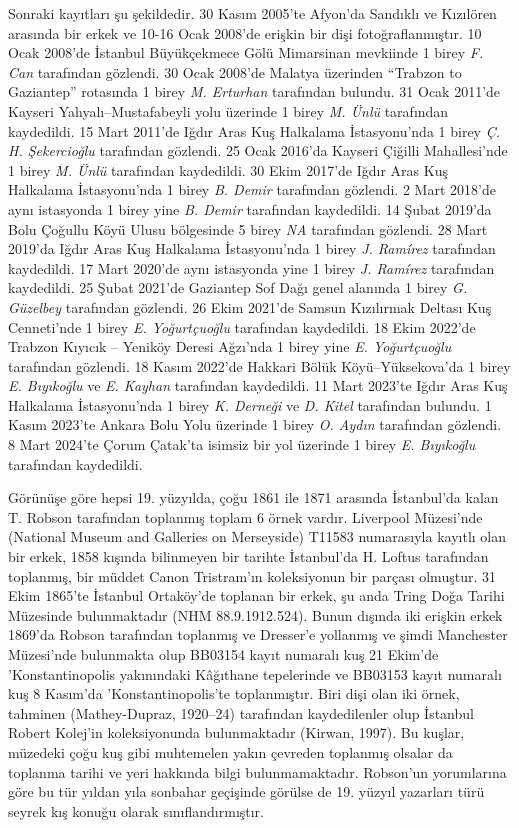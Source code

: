 \documentclass[
  10.5pt,
  a4paper,
  DIV=11,
  numbers=noendperiod,
  twocolumn]{scrreprt}
\begin{document}
Sonraki kayıtları şu şekildedir. 30 Kasım 2005'te Afyon'da Sandıklı ve
Kızılören arasında bir erkek ve 10-16 Ocak 2008'de erişkin bir dişi
fotoğraflanmıştır. 10 Ocak 2008'de İstanbul Büyükçekmece Gölü Mimarsinan
mevkiinde 1 birey \emph{F. Can} tarafından gözlendi. 30 Ocak 2008'de
Malatya üzerinden ``Trabzon to Gaziantep'' rotasında 1 birey \emph{M.
Erturhan} tarafından bulundu. 31 Ocak 2011'de Kayseri
Yahyalı--Mustafabeyli yolu üzerinde 1 birey \emph{M. Ünlü} tarafından
kaydedildi. 15 Mart 2011'de Iğdır Aras Kuş Halkalama İstasyonu'nda 1
birey \emph{Ç. H. Şekercioğlu} tarafından gözlendi. 25 Ocak 2016'da
Kayseri Çiğilli Mahallesi'nde 1 birey \emph{M. Ünlü} tarafından
kaydedildi. 30 Ekim 2017'de Iğdır Aras Kuş Halkalama İstasyonu'nda 1
birey \emph{B. Demir} tarafından gözlendi. 2 Mart 2018'de aynı
istasyonda 1 birey yine \emph{B. Demir} tarafından kaydedildi. 14 Şubat
2019'da Bolu Çoğullu Köyü Ulusu bölgesinde 5 birey \emph{NA} tarafından
gözlendi. 28 Mart 2019'da Iğdır Aras Kuş Halkalama İstasyonu'nda 1 birey
\emph{J. Ramírez} tarafından kaydedildi. 17 Mart 2020'de aynı istasyonda
yine 1 birey \emph{J. Ramírez} tarafından kaydedildi. 25 Şubat 2021'de
Gaziantep Sof Dağı genel alanında 1 birey \emph{G. Güzelbey} tarafından
gözlendi. 26 Ekim 2021'de Samsun Kızılırmak Deltası Kuş Cenneti'nde 1
birey \emph{E. Yoğurtçuoğlu} tarafından kaydedildi. 18 Ekim 2022'de
Trabzon Kıyıcık -- Yeniköy Deresi Ağzı'nda 1 birey yine \emph{E.
Yoğurtçuoğlu} tarafından gözlendi. 18 Kasım 2022'de Hakkari Bölük
Köyü--Yüksekova'da 1 birey \emph{E. Bıyıkoğlu} ve \emph{E. Kayhan}
tarafından kaydedildi. 11 Mart 2023'te Iğdır Aras Kuş Halkalama
İstasyonu'nda 1 birey \emph{K. Derneği} ve \emph{D. Kitel} tarafından
bulundu. 1 Kasım 2023'te Ankara Bolu Yolu üzerinde 1 birey \emph{O.
Aydın} tarafından gözlendi. 8 Mart 2024'te Çorum Çatak'ta isimsiz bir
yol üzerinde 1 birey \emph{E. Bıyıkoğlu} tarafından kaydedildi.

Görünüşe göre hepsi 19. yüzyılda, çoğu 1861 ile 1871 arasında
İstanbul'da kalan T. Robson tarafından toplanmış toplam 6 örnek vardır.
Liverpool Müzesi'nde (National Museum and Galleries on Merseyside)
T11583 numarasıyla kayıtlı olan bir erkek, 1858 kışında bilinmeyen bir
tarihte İstanbul'da H. Loftus tarafından toplanmış, bir müddet Canon
Tristram'ın koleksiyonun bir parçası olmuştur. 31 Ekim 1865'te İstanbul
Ortaköy'de toplanan bir erkek, şu anda Tring Doğa Tarihi Müzesinde
bulunmaktadır (NHM 88.9.1912.524). Bunun dışında iki erişkin erkek
1869'da Robson tarafından toplanmış ve Dresser'e yollanmış ve şimdi
Manchester Müzesi'nde bulunmakta olup BB03154 kayıt numaralı kuş 21
Ekim'de 'Konstantinopolis yakınındaki Kâğıthane tepelerinde ve BB03153
kayıt numaralı kuş 8 Kasım'da 'Konstantinopolis'te toplanmıştır. Biri
dişi olan iki örnek, tahminen (Mathey-Dupraz, 1920--24) tarafından
kaydedilenler olup İstanbul Robert Kolej'in koleksiyonunda bulunmaktadır
(Kirwan, 1997). Bu kuşlar, müzedeki çoğu kuş gibi muhtemelen yakın
çevreden toplanmış olsalar da toplanma tarihi ve yeri hakkında bilgi
bulunmamaktadır. Robson'un yorumlarına göre bu tür yıldan yıla sonbahar
geçişinde görülse de 19. yüzyıl yazarları türü seyrek kış konuğu olarak
sınıflandırmıştır.
\end{document}
